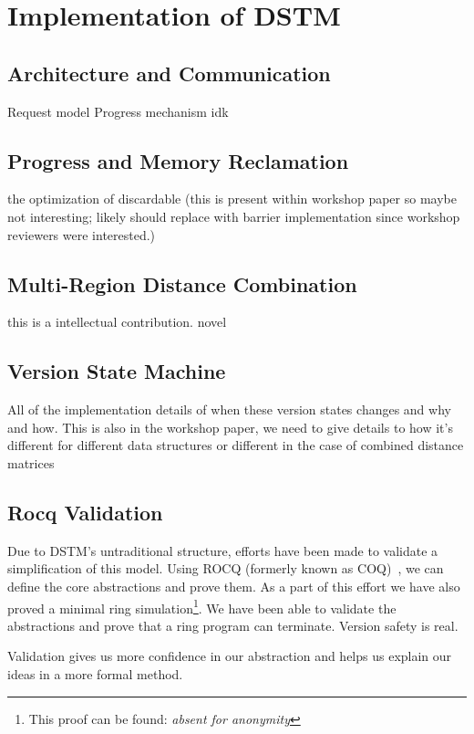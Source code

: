 \section{Implementation of DSTM}
\label{ref:implementation}

\subsection{Architecture and Communication}
Request model
Progress mechanism
idk

\subsection{Progress and Memory Reclamation}
the optimization of discardable (this is present within workshop paper so maybe not interesting; likely should replace with barrier implementation since workshop reviewers were interested.)

\subsection{Multi-Region Distance Combination}
this is a intellectual contribution. novel %

\subsection{Version State Machine}
All of the implementation details of when these version states changes and why and how.
This is also in the workshop paper, we need to give details to how it's different for different data structures or different in the case of combined distance matrices

\subsection{Rocq Validation}
Due to DSTM's untraditional structure, efforts have been made to validate a simplification of this model. Using ROCQ (formerly known as COQ)~\cite{rocq-prover}, we can define the core abstractions and prove them. As a part of this effort we have also proved a minimal ring simulation\footnote{This proof can be found: \textit{absent for anonymity}}. We have been able to validate the abstractions and prove that a ring program can terminate. Version safety is real.

Validation gives us more confidence in our abstraction and helps us explain our ideas in a more formal method.
